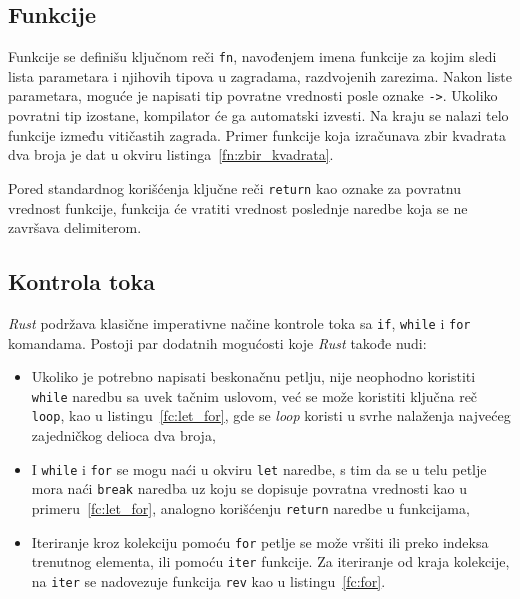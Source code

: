 \documentclass[12pt,oneside]{memoir}
\begin{document}
\subsection{Funkcije}
Funkcije se definišu ključnom reči \texttt{fn}, navođenjem imena funkcije za kojim sledi
lista parametara i njihovih tipova u zagradama, razdvojenih zarezima. Nakon liste parametara,
moguće je napisati tip povratne vrednosti posle oznake \texttt{->}. Ukoliko povratni tip izostane,
kompilator će ga automatski izvesti. Na kraju se nalazi telo funkcije između vitičastih zagrada.
Primer funkcije koja izračunava zbir kvadrata dva broja je dat u okviru listinga~\ref{fn:zbir_kvadrata}.



\noindent
Pored standardnog korišćenja ključne reči \texttt{return} kao oznake za povratnu vrednost funkcije,
funkcija će vratiti vrednost poslednje naredbe koja se ne završava delimiterom.

\subsection{Kontrola toka}
\emph{Rust} podržava klasične imperativne načine kontrole toka sa \texttt{if},
\texttt{while} i \texttt{for} komandama. Postoji par dodatnih mogućosti
koje \emph{Rust} takođe nudi:

\begin{itemize}
  \item Ukoliko je potrebno napisati beskonačnu petlju, nije neophodno koristiti
        \texttt{while} naredbu sa uvek tačnim uslovom, već se može koristiti
        ključna reč \texttt{loop}, kao u listingu~\ref{fc:let_for}, gde se
        \emph{loop} koristi u svrhe nalaženja najvećeg zajedničkog delioca
        dva broja,
  \item I \texttt{while} i \texttt{for} se mogu naći u okviru \texttt{let}
        naredbe, s tim da se u telu petlje mora naći \texttt{break} naredba
        uz koju se dopisuje povratna vrednosti kao u primeru~\ref{fc:let_for},
        analogno korišćenju \texttt{return}
        naredbe u funkcijama,
  \item Iteriranje kroz kolekciju pomoću \texttt{for} petlje se može vršiti ili
        preko indeksa trenutnog elementa, ili pomoću \texttt{iter} funkcije.
        Za iteriranje od kraja kolekcije, na \texttt{iter} se nadovezuje
        funkcija \texttt{rev} kao u listingu~\ref{fc:for}.
\end{itemize}
\end{document}
